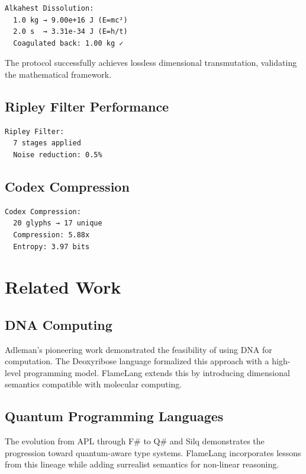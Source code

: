 \documentclass[11pt,a4paper]{article}
\begin{document}
\begin{verbatim}
Alkahest Dissolution:
  1.0 kg → 9.00e+16 J (E=mc²)
  2.0 s  → 3.31e-34 J (E=h/t)
  Coagulated back: 1.00 kg ✓
\end{verbatim}

The protocol successfully achieves lossless dimensional transmutation, validating the mathematical framework.

\subsection{Ripley Filter Performance}

\begin{verbatim}
Ripley Filter:
  7 stages applied
  Noise reduction: 0.5%
\end{verbatim}

\subsection{Codex Compression}

\begin{verbatim}
Codex Compression:
  20 glyphs → 17 unique
  Compression: 5.88x
  Entropy: 3.97 bits
\end{verbatim}

\section{Related Work}

\subsection{DNA Computing}

Adleman's pioneering work \cite{adleman1994} demonstrated the feasibility of using DNA for computation. The Deoxyribose language \cite{deoxyribose2018} formalized this approach with a high-level programming model. FlameLang extends this by introducing dimensional semantics compatible with molecular computing.

\subsection{Quantum Programming Languages}

The evolution from APL \cite{iverson1962} through F\# \cite{syme2007} to Q\# \cite{svore2018} and Silq \cite{bichsel2020} demonstrates the progression toward quantum-aware type systems. FlameLang incorporates lessons from this lineage while adding surrealist semantics for non-linear reasoning.
\end{document}

